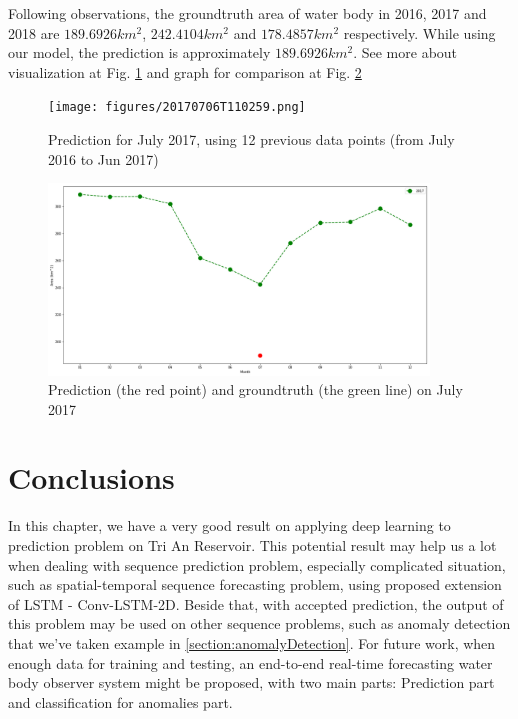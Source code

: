 Following observations, the groundtruth area of water body in 2016, 2017 and 2018 are $189.6926 km^2$, $242.4104 km^2$ and $178.4857 km^2$ respectively. While using our model, the prediction is approximately $189.6926 km^2$. See more about visualization at Fig. \ref{fig:anomalyVis} and graph for comparison at Fig. \ref{fig:anomalyComp}

\begin{figure}[h!]
	\centering
	\texttt{[image: figures/20170706T110259.png]}
	\caption{Prediction for July 2017, using 12 previous data points (from July 2016 to Jun 2017)}
	\label{fig:anomalyVis}
\end{figure}


\begin{figure}[h!]
	\centering
	\includegraphics[width=0.9\textwidth]{figures/anomaly.png}
	\caption{Prediction (the red point) and groundtruth (the green line) on July 2017}
	\label{fig:anomalyComp}
\end{figure}

\section{Conclusions}

In this chapter, we have a very good result on applying deep learning to prediction problem on Tri An Reservoir. This potential result may help us a lot when dealing with sequence prediction problem, especially complicated situation, such as spatial-temporal sequence forecasting problem, using proposed extension of LSTM - Conv-LSTM-2D. Beside that, with accepted prediction, the output of this problem may be used on other sequence problems, such as anomaly detection that we've taken example in \ref{section:anomalyDetection}. For future work, when enough data for training and testing, an end-to-end real-time forecasting water body observer system might be proposed, with two main parts: Prediction part and classification for anomalies part. 